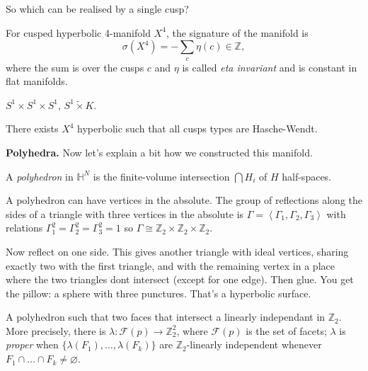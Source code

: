 So which can be realised by a single cusp?

\begin{theorem}
\label{theorem-ferrari-long-reid}
For cusped hyperbolic 4-manifold $X^4$, the
signature of the manifold is
$$\sigma(X^4)=-\sum_{c}\eta(c)\in\mathbb{Z},
$$
where the sum is over the cusps $c$ and
$\eta$ is called \textit{eta invariant} and
is constant in flat manifolds.
\end{theorem}

\begin{theorem}
\label{theorem-ferrari-kolpakov}
$S^1 \times S^1\times S^1$,
$S^1\tilde{\times}K$.
\end{theorem}

\begin{theorem}
\label{theorem-ferrari-fks}
There exists $X^4$ hyperbolic such that all
cusps types are Hasche-Wendt.
\end{theorem}

\medskip\noindent
{\bf Polyhedra.}
Now let's explain a bit how we constructed
this manifold.

\begin{definition}
\label{definition-ferrari-polyhedron}
A \textit{polyhedron} in $\mathbb{H}^N$ is
the finite-volume intersection $\bigcap H_i $
of $H$ half-spaces.
\end{definition}

\begin{example}
\label{example-ferrari-pillow}
A polyhedron can have vertices in the
absolute. The group of reflections along the
sides of a triangle with three vertices in
the absolute is $\Gamma=\left\langle{}
\Gamma_1,\Gamma_2,\Gamma_3 \right\rangle{}$
with relations
$\Gamma_1^2=\Gamma_2^2=\Gamma_3^2=1$ so
$\Gamma\cong\mathbb{Z}_2\times\mathbb{Z}_2
\times\mathbb{Z}_2$.

Now reflect on one side. This gives another
triangle with ideal vertices, sharing exactly
two with the first triangle, and with the
remaining vertex in a place where the two
triangles dont intersect (except for one
edge). Then glue. You get the pillow: a
sphere with three punctures. That's a
hyperbolic surface.
\end{example}

A polyhedron such that two faces that
intersect a linearly independant in
$\mathbb{Z}_2$. More precisely, there is
$\lambda:\mathcal{F}(p)\to \mathbb{Z}_2^2$,
where $\mathcal{F}(p)$ is the set of facets;
$\lambda$ is \textit{proper} when
$\{\lambda(F_1),\ldots,\lambda(F_k)\}$ are
$\mathbb{Z}_2$-linearly independent whenever
$F_1 \cap\ldots\cap F_k\neq \varnothing$.

